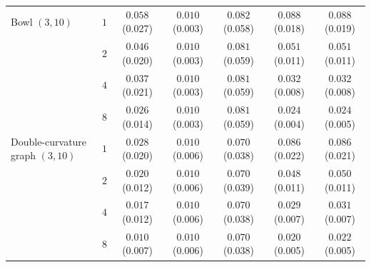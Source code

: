 \begin{tabular}{lcccccc}
\midrule
Bowl $(3,10)$ & $1$ & $0.058$ \scriptsize(0.027) & $0.010$ \scriptsize(0.003) & $0.082$ \scriptsize(0.058) & $0.088$ \scriptsize(0.018) & $0.088$ \scriptsize(0.019) \\
 & $2$ & $0.046$ \scriptsize(0.020) & $0.010$ \scriptsize(0.003) & $0.081$ \scriptsize(0.059) & $0.051$ \scriptsize(0.011) & $0.051$ \scriptsize(0.011) \\
 & $4$ & $0.037$ \scriptsize(0.021) & $0.010$ \scriptsize(0.003) & $0.081$ \scriptsize(0.059) & $0.032$ \scriptsize(0.008) & $0.032$ \scriptsize(0.008) \\
 & $8$ & $0.026$ \scriptsize(0.014) & $0.010$ \scriptsize(0.003) & $0.081$ \scriptsize(0.059) & $0.024$ \scriptsize(0.004) & $0.024$ \scriptsize(0.005) \\
\midrule
Double-curvature graph $(3,10)$ & $1$ & $0.028$ \scriptsize(0.020) & $0.010$ \scriptsize(0.006) & $0.070$ \scriptsize(0.038) & $0.086$ \scriptsize(0.022) & $0.086$ \scriptsize(0.021) \\
 & $2$ & $0.020$ \scriptsize(0.012) & $0.010$ \scriptsize(0.006) & $0.070$ \scriptsize(0.039) & $0.048$ \scriptsize(0.011) & $0.050$ \scriptsize(0.011) \\
 & $4$ & $0.017$ \scriptsize(0.012) & $0.010$ \scriptsize(0.006) & $0.070$ \scriptsize(0.038) & $0.029$ \scriptsize(0.007) & $0.031$ \scriptsize(0.007) \\
 & $8$ & $0.010$ \scriptsize(0.007) & $0.010$ \scriptsize(0.006) & $0.070$ \scriptsize(0.038) & $0.020$ \scriptsize(0.005) & $0.022$ \scriptsize(0.005) \\
\bottomrule
\end{tabular}
